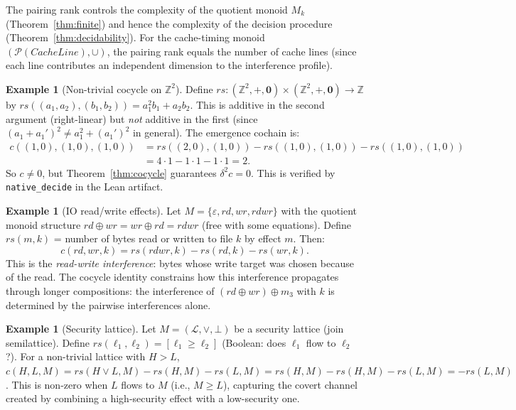 \documentclass[acmsmall,sigplan,anonymous,review,screen]{acmart}
\theoremstyle{plain}
\theoremstyle{definition}
\newtheorem{example}[theorem]{Example}
\newcommand{\rs}{\mathit{rs}}
\newcommand{\lean}[1]{\texttt{#1}}
\begin{document}
The pairing rank controls the complexity of the quotient monoid $M_k$
(Theorem~\ref{thm:finite}) and hence the complexity of the decision
procedure (Theorem~\ref{thm:decidability}).  For the cache-timing monoid
$(\mathcal{P}(\mathit{CacheLine}), \cup)$, the pairing rank equals the
number of cache lines (since each line contributes an independent dimension
to the interference profile).

\begin{example}[Non-trivial cocycle on $\mathbb{Z}^2$]
\label{ex:quadratic}
  Define $\rs : (\mathbb{Z}^2, +, \mathbf{0}) \times (\mathbb{Z}^2, +, \mathbf{0})
  \to \mathbb{Z}$ by
  $\rs((a_1, a_2), (b_1, b_2)) = a_1^2 b_1 + a_2 b_2$.
  This is additive in the second argument (right-linear) but \emph{not}
  additive in the first (since $(a_1 + a_1')^2 \neq a_1^2 + (a_1')^2$ in
  general).  The emergence cochain is:
  \begin{align*}
    c((1,0),(1,0),(1,0)) &= \rs((2,0),(1,0)) - \rs((1,0),(1,0)) - \rs((1,0),(1,0)) \\
    &= 4 \cdot 1 - 1 \cdot 1 - 1 \cdot 1 = 2.
  \end{align*}
  So $c \neq 0$, but Theorem~\ref{thm:cocycle} guarantees $\delta^2 c = 0$.
  This is verified by \lean{native\_decide} in the Lean artifact.
\end{example}

\begin{example}[IO read/write effects]
\label{ex:io}
  Let $M = \{\varepsilon, \mathit{rd}, \mathit{wr}, \mathit{rdwr}\}$
  with the quotient monoid structure $\mathit{rd} \oplus \mathit{wr}
  = \mathit{wr} \oplus \mathit{rd} = \mathit{rdwr}$ (free with some
  equations).  Define $\rs(m, k)$ = number of bytes read or written to
  file $k$ by effect $m$.  Then:
  \[
    c(\mathit{rd}, \mathit{wr}, k) = \rs(\mathit{rdwr}, k) - \rs(\mathit{rd}, k) - \rs(\mathit{wr}, k).
  \]
  This is the \emph{read-write interference}: bytes whose write target
  was chosen because of the read.  The cocycle identity constrains how
  this interference propagates through longer compositions: the
  interference of $(\mathit{rd} \oplus \mathit{wr}) \oplus m_3$ with
  $k$ is determined by the pairwise interferences alone.
\end{example}

\begin{example}[Security lattice]
\label{ex:sec}
  Let $M = (\mathcal{L}, \vee, \bot)$ be a security lattice (join
  semilattice).  Define $\rs(\ell_1, \ell_2) = [\ell_1 \geq \ell_2]$
  (Boolean: does $\ell_1$ flow to $\ell_2$?).  For a non-trivial lattice
  with $H > L$, $c(H, L, M) = \rs(H \vee L, M) - \rs(H, M) - \rs(L, M)
  = \rs(H, M) - \rs(H, M) - \rs(L, M) = -\rs(L, M)$.
  This is non-zero when $L$ flows to $M$ (i.e., $M \geq L$), capturing
  the covert channel created by combining a high-security effect with a
  low-security one.
\end{example}
\end{document}
